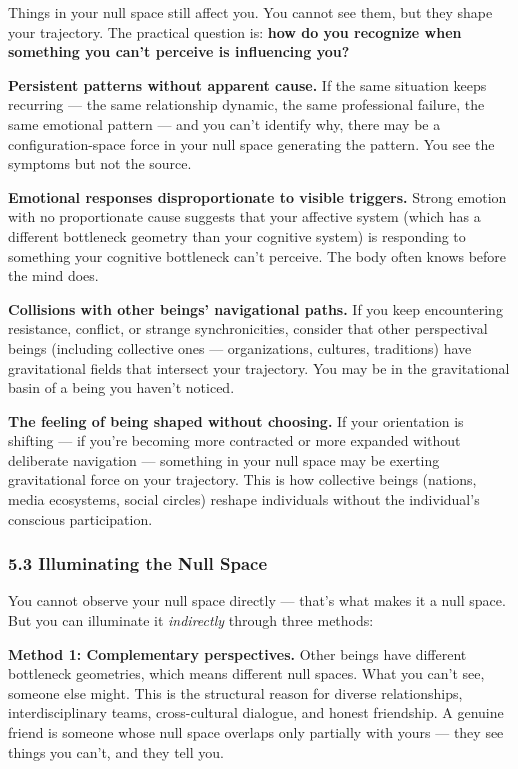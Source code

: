 Things in your null space still affect you. You cannot see them, but they shape your trajectory. The practical question is: \textbf{how do you recognize when something you can't perceive is influencing you?}


\textbf{Persistent patterns without apparent cause.} If the same situation keeps recurring — the same relationship dynamic, the same professional failure, the same emotional pattern — and you can't identify why, there may be a configuration-space force in your null space generating the pattern. You see the symptoms but not the source.


\textbf{Emotional responses disproportionate to visible triggers.} Strong emotion with no proportionate cause suggests that your affective system (which has a different bottleneck geometry than your cognitive system) is responding to something your cognitive bottleneck can't perceive. The body often knows before the mind does.


\textbf{Collisions with other beings' navigational paths.} If you keep encountering resistance, conflict, or strange synchronicities, consider that other perspectival beings (including collective ones — organizations, cultures, traditions) have gravitational fields that intersect your trajectory. You may be in the gravitational basin of a being you haven't noticed.


\textbf{The feeling of being shaped without choosing.} If your orientation is shifting — if you're becoming more contracted or more expanded without deliberate navigation — something in your null space may be exerting gravitational force on your trajectory. This is how collective beings (nations, media ecosystems, social circles) reshape individuals without the individual's conscious participation.


\subsubsection*{5.3 Illuminating the Null Space}


You cannot observe your null space directly — that's what makes it a null space. But you can illuminate it \textit{indirectly} through three methods:


\textbf{Method 1: Complementary perspectives.} Other beings have different bottleneck geometries, which means different null spaces. What you can't see, someone else might. This is the structural reason for diverse relationships, interdisciplinary teams, cross-cultural dialogue, and honest friendship. A genuine friend is someone whose null space overlaps only partially with yours — they see things you can't, and they tell you.


